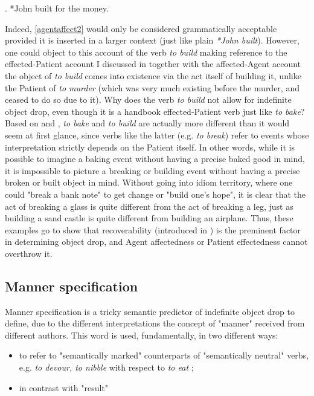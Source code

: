 \ex. \label{agentaffect2} *John built for the money.

Indeed, \ref{agentaffect2} would only be considered grammatically acceptable provided it is inserted in a larger context (just like plain \textit{*John built}). However, one could object to this account of the verb \textit{to build} making reference to the effected-Patient account I discussed in  together with the affected-Agent account \textemdash the object of \textit{to build} comes into existence via the act itself of building it, unlike the Patient of \textit{to murder} (which was very much existing before the murder, and ceased to do so due to it). Why does the verb \textit{to build} not allow for indefinite object drop, even though it is a handbook effected-Patient verb just like \textit{to bake}? Based on \textcite[512]{Goldberg2001} and \textcite[139]{Naess2007}, \textit{to bake} and \textit{to build} are actually more different than it would seem at first glance, since verbs like the latter (e.g. \textit{to break}) refer to events whose interpretation strictly depends on the Patient itself. In other words, while it is possible to imagine a baking event without having a precise baked good in mind, it is impossible to picture a breaking or building event without having a precise broken or built object in mind. Without going into idiom territory, where one could "break a bank note" to get change or "build one's hope", it is clear that the act of breaking a glass is quite different from the act of breaking a leg, just as building a sand castle is quite different from building an airplane. Thus, these examples go to show that recoverability (introduced in ) is the preminent factor in determining object drop, and Agent affectedness or Patient effectedness cannot overthrow it.


\subsection{Manner specification} 

Manner specification is a tricky semantic predictor of indefinite object drop to define, due to the different interpretations the concept of "manner" received from different authors. This word is used, fundamentally, in two different ways:
\begin{itemize}
    \item to refer to "semantically marked" counterparts of "semantically neutral" verbs, e.g. \textit{to devour, to nibble} with respect to \textit{to eat} \parencite[130-134]{Naess2007};
    \item in contrast with "result" %
\end{itemize}

